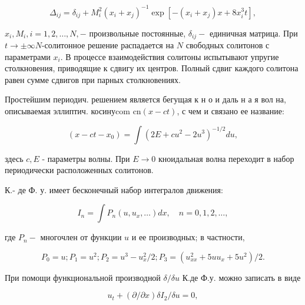 \documentclass[10pt]{article}
\begin{document}
\[

\Delta_{i j}=\delta_{i j}+M_{i}^{2}\left(x_{i}+x_{j}\right)^{-1} \exp \left[-\left(x_{i}+x_{j}\right) x+8 x_{i}^{3} t\right],

\]



$x_{i}, M_{i}, i=1,2, \ldots, N,-$ произвольные постоянные, $\delta_{i j}-$ единичная матрица. При $t \rightarrow \pm \infty N$-солитонное решение распадается на $N$ свободных солитонов с параметрами $x_{i}$. В процессе взаимодействия солитоны испытывают упругие столкновения, приводящие к сдвигу их центров. Полный сдвиг каждого солитона равен сумме сдвигов при парных столкновениях.



Простейшим периодич. решением является бегущая к н о и даль н а я вол на, описываемая эллиптич. косинуcom $\mathrm{cn}(x-c t)$, с чем и связано ее название:



\[

\left(x-c t-x_{0}\right)=\int\left(2 E+c u^{2}-2 u^{3}\right)^{-1 / 2} d u,

\]



здесь $c, E$ - параметры волны. При $E \rightarrow 0$ кноидальная волна переходит в набор периодически расположенных солитонов.



К.- де Ф. у. имеет бесконечный набор интегралов движения:



\[

I_{n}=\int P_{n}\left(u, u_{x}, \ldots\right) d x, \quad n=0,1,2, \ldots,

\]



где $P_{n}-$ многочлен от функции $u$ и ее производных; в частности,



\[

P_{0}=u ; P_{1}=u^{2} ; P_{2}=u^{3}-u_{x}^{2} / 2 ; P_{3}=\left(u_{x x}^{2}+5 u u_{x}+5 u^{2}\right) / 2 .

\]



При помощи функциональной производной $\delta / \delta u$ К.де Ф.у. можно записать в виде



\[

u_{t}+(\partial / \partial x) \delta I_{2} / \delta u=0,

\]
\end{document}
